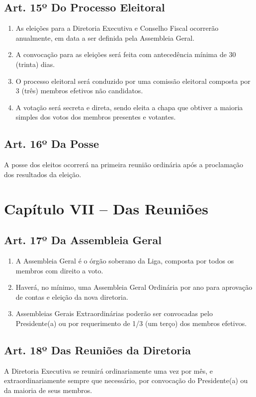 \documentclass[12pt, a4paper]{article}
\begin{document}
\subsection{Art. 15º Do Processo Eleitoral}
\begin{enumerate}[label=\S \arabic*.]
    \item As eleições para a Diretoria Executiva e Conselho Fiscal ocorrerão anualmente, em data a ser definida pela Assembleia Geral.
    \item A convocação para as eleições será feita com antecedência mínima de 30 (trinta) dias.
    \item O processo eleitoral será conduzido por uma comissão eleitoral composta por 3 (três) membros efetivos não candidatos.
    \item A votação será secreta e direta, sendo eleita a chapa que obtiver a maioria simples dos votos dos membros presentes e votantes.
\end{enumerate}

\subsection{Art. 16º Da Posse}
A posse dos eleitos ocorrerá na primeira reunião ordinária após a proclamação dos resultados da eleição.


\section{Capítulo VII – Das Reuniões}


\subsection{Art. 17º Da Assembleia Geral}
\begin{enumerate}[label=\S \arabic*.]
    \item A Assembleia Geral é o órgão soberano da Liga, composta por todos os membros com direito a voto.
    \item Haverá, no mínimo, uma Assembleia Geral Ordinária por ano para aprovação de contas e eleição da nova diretoria.
    \item Assembleias Gerais Extraordinárias poderão ser convocadas pelo Presidente(a) ou por requerimento de 1/3 (um terço) dos membros efetivos.
\end{enumerate}

\subsection{Art. 18º Das Reuniões da Diretoria}
A Diretoria Executiva se reunirá ordinariamente uma vez por mês, e extraordinariamente sempre que necessário, por convocação do Presidente(a) ou da maioria de seus membros.
\end{document}
